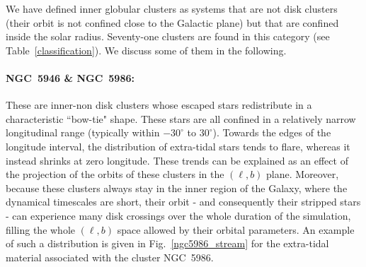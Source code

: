             We have defined inner globular clusters as systems that are not disk clusters (their orbit is not confined close to the Galactic plane) but that are confined inside the solar radius. Seventy-one clusters are found in this category (see  Table~\ref{classification}). We discuss some of them in the following.

            \paragraph{NGC~5946 \& NGC~5986:}

            These are inner-non disk clusters whose escaped stars redistribute in a characteristic ``bow-tie" shape. These stars are all confined in a relatively narrow longitudinal range (typically within $-30^\circ$ to $30^\circ$). Towards the edges of the longitude interval, the distribution of extra-tidal stars tends to flare, whereas it instead shrinks at zero longitude. These trends can be explained as an effect of the projection of the orbits of these clusters in the $(\ell, b)$ plane.  Moreover, because these clusters always stay in the inner region of the Galaxy, where the dynamical timescales are short, their orbit - and consequently their stripped stars - can experience many disk crossings over the whole duration of the simulation, filling the whole $(\ell, b)$ space allowed by their orbital parameters. An example of such a distribution is given in Fig.~\ref{ngc5986_stream} for the extra-tidal material associated with the cluster NGC~5986.
            \twocolumn
